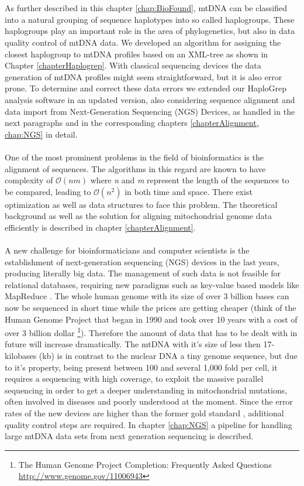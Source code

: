 \\
\\
As further described in this chapter \ref{chap:BioFound}, mtDNA can be classified into a natural grouping of sequence haplotypes into so called haplogroups. These haplogroups play an important role in the area of phylogenetics, but also in data quality control of mtDNA data. We developed
an algorithm for assigning the closest haplogroup to mtDNA profiles based on an XML-tree as shown in Chapter \ref{chapterHaplogrep}. With classical sequencing devices the data generation of mtDNA profiles might seem straightforward, but it is also error prone. To determine and correct these data errors we extended our HaploGrep analysis software in an updated version, also considering sequence alignment and data import from Next-Generation Sequencing (NGS) Devices, as handled in the next paragraphs and in the corresponding chapters \ref{chapterAlignment, chap:NGS} in detail.
\\
\\
One of the most prominent problems in the field of bioinformatics is the alignment of sequences. The algorithms in this regard are known to have complexity of $\mathcal O(nm)$ where \textit{n} and \textit{m} represent the length of the sequences to be compared, leading to $\mathcal O(n^2)$ in both time and space. There exist optimization as well as data structures to face this problem. The theoretical background as well as the solution for aligning mitochondrial genome data efficiently is described in chapter \ref{chapterAlignment}.
\\
\\
A new challenge for bioinformaticians and computer scientists is the establishment of next-generation sequencing (NGS) devices in the last years, producing literally big data. The management of such data is not feasible for relational databases, requiring new paradigms such as key-value based models like MapReduce \cite{Dean2008}. The whole human genome with its size of over 3 billion bases can now be sequenced in short time while the prices are getting cheaper (think of the Human Genome Project that began in 1990 and took over 10 years with a cost of over 3 billion dollar \footnote{The Human Genome Project Completion: Frequently Asked Questions \url{http://www.genome.gov/11006943}}). Therefore the amount of data that has to be dealt with in future will increase dramatically. The mtDNA with it's size of less then 17-kilobases (kb) is in contrast to the nuclear DNA a tiny genome sequence, but due to it's property, being present between 100 and several 1,000 fold per cell, it requires a sequencing with high coverage, to exploit the massive parallel sequencing in order to get a deeper understanding in mitochondrial mutations, often involved in diseases and poorly understood at the moment. Since the error rates of the new devices are higher than the former gold standard \cite{Wang2011}, additional quality control steps are required. In chapter \ref{chap:NGS} a pipeline for handling large mtDNA data sets from next generation sequencing is described.
